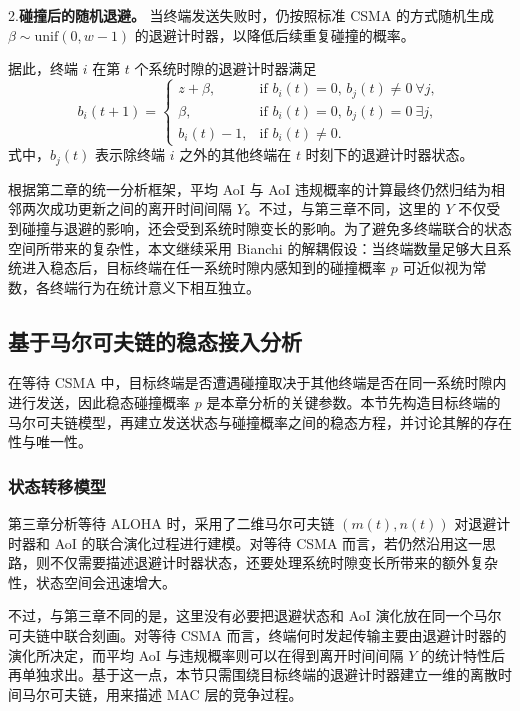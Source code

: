 2.\textbf{碰撞后的随机退避。} 当终端发送失败时，仍按照标准 CSMA 的方式随机生成 $\beta \sim \text{unif}(0,w-1)$ 的退避计时器，以降低后续重复碰撞的概率。

据此，终端 $i$ 在第 $t$ 个系统时隙的退避计时器满足
\begin{equation}\label{cp4_backoff_counter_evolution}
    b_i(t + 1) =
\begin{cases}
z + \beta, & \text{if } b_i(t) = 0, \, b_j(t) \neq 0 \ \forall j, \\
\beta, & \text{if } b_i(t) = 0, \, b_j(t) = 0 \ \exists j, \\
b_i(t) - 1, & \text{if } b_i(t) \neq 0.
\end{cases}
\end{equation}
式中，$b_j(t)$ 表示除终端 $i$ 之外的其他终端在 $t$ 时刻下的退避计时器状态。

根据第二章的统一分析框架，平均 AoI 与 AoI 违规概率的计算最终仍然归结为相邻两次成功更新之间的离开时间间隔 $Y$。不过，与第三章不同，这里的 $Y$ 不仅受到碰撞与退避的影响，还会受到系统时隙变长的影响。为了避免多终端联合的状态空间所带来的复杂性，本文继续采用 Bianchi 的解耦假设：当终端数量足够大且系统进入稳态后，目标终端在任一系统时隙内感知到的碰撞概率 $p$ 可近似视为常数，各终端行为在统计意义下相互独立。

\subsection{基于马尔可夫链的稳态接入分析}

在等待 CSMA 中，目标终端是否遭遇碰撞取决于其他终端是否在同一系统时隙内进行发送，因此稳态碰撞概率 $p$ 是本章分析的关键参数。本节先构造目标终端的马尔可夫链模型，再建立发送状态与碰撞概率之间的稳态方程，并讨论其解的存在性与唯一性。

\subsubsection{状态转移模型}

第三章分析等待 ALOHA 时，采用了二维马尔可夫链 $(m(t),n(t))$ 对退避计时器和 AoI 的联合演化过程进行建模。对等待 CSMA 而言，若仍然沿用这一思路，则不仅需要描述退避计时器状态，还要处理系统时隙变长所带来的额外复杂性，状态空间会迅速增大。

不过，与第三章不同的是，这里没有必要把退避状态和 AoI 演化放在同一个马尔可夫链中联合刻画。对等待 CSMA 而言，终端何时发起传输主要由退避计时器的演化所决定，而平均 AoI 与违规概率则可以在得到离开时间间隔 $Y$ 的统计特性后再单独求出。基于这一点，本节只需围绕目标终端的退避计时器建立一维的离散时间马尔可夫链，用来描述 MAC 层的竞争过程。


